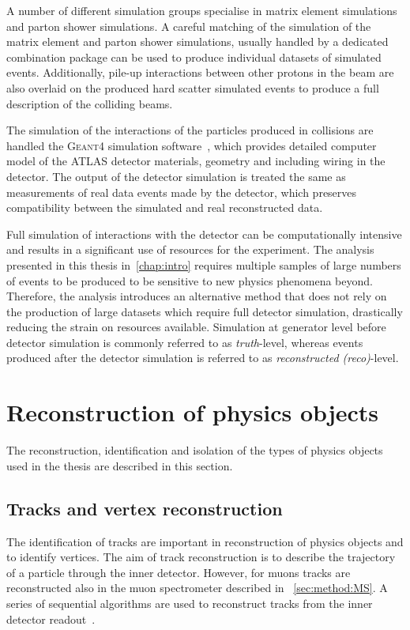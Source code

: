 A number of different simulation groups specialise in matrix element simulations and parton shower simulations. A careful matching of the simulation of the matrix element and parton shower simulations, usually handled by a dedicated combination package can be used to produce individual datasets of simulated events. Additionally, pile-up interactions between other protons in the beam are also overlaid on the produced hard scatter simulated events to produce a full description of the colliding beams. 

The simulation of the interactions of the particles produced in collisions are handled the \textsc{Geant4} simulation software~\cite{Geant1,Geant2,Geant3}, which provides detailed computer model of the ATLAS detector materials, geometry and including wiring in the detector. The output of the detector simulation is treated the same as measurements of real data events made by the detector, which preserves compatibility between the simulated and real reconstructed data. 

Full simulation of interactions with the detector can be computationally intensive and results in a significant use of resources for the experiment. The analysis presented in this thesis in~\cref{chap:intro} requires multiple samples of large numbers of events to be produced to be sensitive to new physics phenomena beyond. Therefore, the analysis introduces an alternative method that does not rely on the production of large datasets which require full detector simulation, drastically reducing the strain on resources available. Simulation at generator level before detector simulation is commonly referred to as \emph{truth}-level, whereas events produced after the detector simulation is referred to as \emph{reconstructed (reco)}-level.

\section{Reconstruction of physics objects}\label{sec:reconstruction}
The reconstruction, identification and isolation of the types of physics objects used in the thesis are described in this section. 

\subsection{Tracks and vertex reconstruction}\label{sec:reconstruction:tracks}
The identification of tracks are important in reconstruction of physics objects and to identify vertices. The aim of track reconstruction is to describe the trajectory of a particle through the inner detector. However, for muons tracks are reconstructed also in the muon spectrometer described in ~\cref{sec:method:MS}. A series of sequential algorithms are used to reconstruct tracks from the inner detector readout~\cite{ATLAS:tracking}. 

